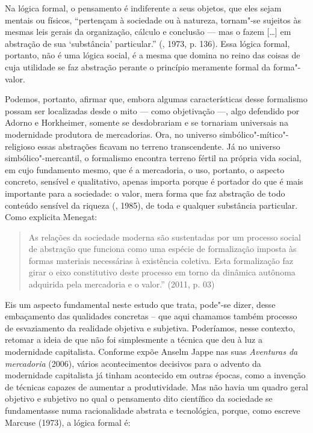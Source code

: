 Na lógica formal, o pensamento é indiferente a seus objetos, que eles
sejam mentais ou físicos, ``pertençam à sociedade ou à natureza,
tornam"-se sujeitos às mesmas leis gerais da organização, cálculo e
conclusão --- mas o fazem [\ldots{}] em abstração de sua `substância'
particular.'' (, 1973, p. 136). Essa lógica formal, portanto, não
é uma lógica social, é a mesma que domina no reino das coisas de cuja
utilidade se faz abstração perante o princípio meramente formal da
forma"-valor.

Podemos, portanto, afirmar que, embora algumas características desse
formalismo possam ser localizadas desde o mito --- como objetivação ---,
algo defendido por Adorno e Horkheimer, somente se desdobrariam e se
tornariam universais na modernidade produtora de mercadorias. Ora, no
universo simbólico"-mítico"-religioso essas abstrações ficavam no terreno
transcendente. Já no universo simbólico"-mercantil, o formalismo encontra
terreno fértil na própria vida social, em cujo fundamento mesmo, que é a
mercadoria, o uso, portanto, o aspecto concreto, sensível e qualitativo,
apenas importa porque é portador do que é mais importante para a
sociedade: o valor, mera forma que faz abstração de todo conteúdo
sensível da riqueza (, 1985), de toda e qualquer substância
particular. Como explicita Menegat:

\begin{quote}
As relações da sociedade moderna são sustentadas por um processo social
de abstração que funciona como uma espécie de formalização imposta às
formas materiais necessárias à existência coletiva. Esta formalização
faz girar o eixo constitutivo deste processo em torno da dinâmica
autônoma adquirida pela mercadoria e o valor.'' (2011, p. 03)
\end{quote}

Eis um aspecto fundamental neste estudo que trata, pode"-se dizer, desse
embaçamento das qualidades concretas -- que aqui chamamos também
processo de esvaziamento da realidade objetiva e subjetiva. Poderíamos,
nesse contexto, retomar a ideia de que não foi simplesmente a técnica
que deu à luz a modernidade capitalista. Conforme expõe Anselm Jappe nas
suas \emph{Aventuras da mercadoria} (2006), vários acontecimentos
decisivos para o advento da modernidade capitalista já tinham acontecido
em outras épocas, como a invenção de técnicas capazes de aumentar a
produtividade. Mas não havia um quadro geral objetivo e subjetivo no
qual o pensamento dito científico da sociedade se fundamentasse numa
racionalidade abstrata e tecnológica, porque, como escreve Marcuse
(1973), a lógica formal é:

